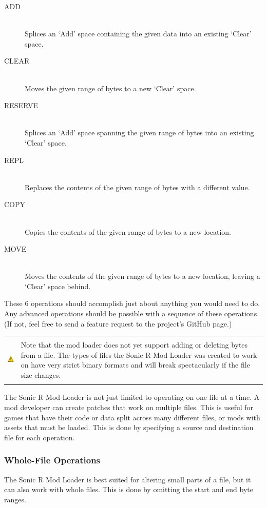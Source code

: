 \documentclass[12pt,a4paper,notitlepage]{article}
\newcommand{\warning}[1]{
    \begin{tabular}{m{1.1cm}  m{11cm}}
    &\\
    \includegraphics[width=1.1cm, height=1.1cm]{warning} & #1
    \\&\\
    \end{tabular}
}
\begin{document}
\begin{description}
\item[ADD] \hfill \\ 
    Splices an `Add' space containing the given data into an existing `Clear' space.
\item[CLEAR] \hfill \\
    Moves the given range of bytes to a new `Clear' space.
\item[RESERVE] \hfill \\
    Splices an `Add' space spanning the given range of bytes into an existing `Clear' space.
\item[REPL] \hfill \\
    Replaces the contents of the given range of bytes with a different value.
\item[COPY] \hfill \\
    Copies the contents of the given range of bytes to a new location.
\item[MOVE] \hfill \\
    Moves the contents of the given range of bytes to a new location, leaving a `Clear' space behind.
\end{description}

These 6 operations should accomplish just about anything you would need to do. Any advanced operations should be possible with a sequence of these operations. (If not, feel free to send a feature request to the project's GitHub page.)

\warning{Note that the mod loader does not yet support adding or deleting bytes from a file. The types of files the Sonic R Mod Loader was created to work on have very strict binary formats and will break spectacularly if the file size changes.}

The Sonic R Mod Loader is not just limited to operating on one file at a time. A mod developer can create patches that work on multiple files. This is useful for games that have their code or data split across many different files, or mods with assets that must be loaded. This is done by specifying a source and destination file for each operation.

\subsubsection{Whole-File Operations}
\label{subsubsec:works-patch-wholefile}
The Sonic R Mod Loader is best suited for altering small parts of a file, but it can also work with whole files. This is done by omitting the start and end byte ranges.
\end{document}
